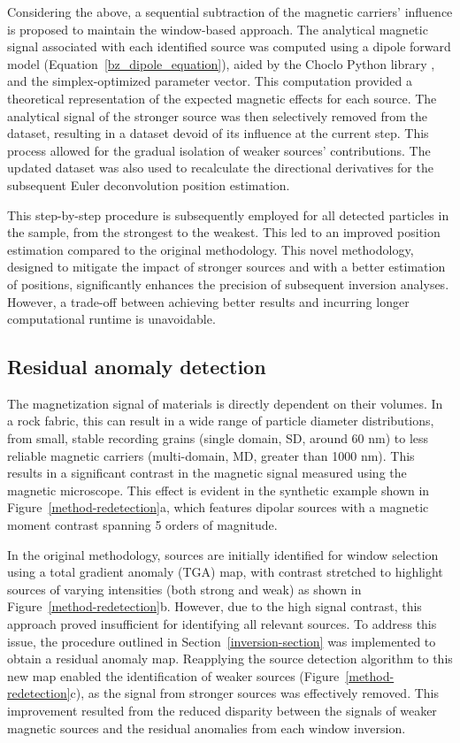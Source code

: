     Considering the above, a sequential subtraction of the magnetic carriers' influence is proposed to maintain the window-based approach. The analytical magnetic signal associated with each identified source was computed using a dipole forward model (Equation~\ref{bz_dipole_equation}), aided by the Choclo Python library \citep{choclo2022}, and the simplex-optimized parameter vector. This computation provided a theoretical representation of the expected magnetic effects for each source. The analytical signal of the stronger source was then selectively removed from the dataset, resulting in a dataset devoid of its influence at the current step. This process allowed for the gradual isolation of weaker sources' contributions. The updated dataset was also used to recalculate the directional derivatives for the subsequent Euler deconvolution position estimation.

    This step-by-step procedure is subsequently employed for all detected particles in the sample, from the strongest to the weakest. This led to an improved position estimation compared to the original methodology. This novel methodology, designed to mitigate the impact of stronger sources and with a better estimation of positions, significantly enhances the precision of subsequent inversion analyses. However, a trade-off between achieving better results and incurring longer computational runtime is unavoidable.

\subsection{Residual anomaly detection}
   The magnetization signal of materials is directly dependent on their volumes. In a rock fabric, this can result in a wide range of particle diameter distributions, from small, stable recording grains (single domain, SD, around 60 nm) to less reliable magnetic carriers (multi-domain, MD, greater than 1000 nm). This results in a significant contrast in the magnetic signal measured using the magnetic microscope. This effect is evident in the synthetic example shown in Figure~\ref{method-redetection}a, which features dipolar sources with a magnetic moment contrast spanning 5 orders of magnitude. 
   
    In the original methodology, sources are initially identified for window selection using a total gradient anomaly (TGA) map, with contrast stretched to highlight sources of varying intensities (both strong and weak) as shown in Figure~\ref{method-redetection}b. However, due to the high signal contrast, this approach proved insufficient for identifying all relevant sources. To address this issue, the procedure outlined in Section~\ref{inversion-section} was implemented to obtain a residual anomaly map. Reapplying the source detection algorithm to this new map enabled the identification of weaker sources (Figure~\ref{method-redetection}c), as the signal from stronger sources was effectively removed. This improvement resulted from the reduced disparity between the signals of weaker magnetic sources and the residual anomalies from each window inversion.

